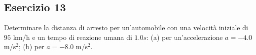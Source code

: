 \documentclass[12pt,a4paper]{book}
\begin{document}
\subsection*{Esercizio 13}  
Determinare la distanza di arresto per un'automobile con una velocità iniziale di $95$ km/h e un tempo di reazione umana di $1.0 s$: (a) per un'accelerazione $a=-4.0$ m/s$^{2}$; (b) per $a=-8.0$ m/s$^{2}$.

\end{document}
